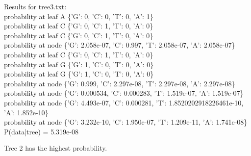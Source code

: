 \documentclass{acm_proc_article-sp}
\begin{document}
Results for tree3.txt: \\
probability at leaf A \{'G': 0, 'C': 0, 'T': 0, 'A': 1\}\\
probability at leaf C \{'G': 0, 'C': 1, 'T': 0, 'A': 0\}\\
probability at leaf C \{'G': 0, 'C': 1, 'T': 0, 'A': 0\}\\
probability at node \{'G': 2.058e-07, 'C': 0.997, 'T': 2.058e-07, 'A': 2.058e-07\}\\
probability at leaf C \{'G': 0, 'C': 1, 'T': 0, 'A': 0\}\\
probability at leaf G \{'G': 1, 'C': 0, 'T': 0, 'A': 0\}\\
probability at leaf G \{'G': 1, 'C': 0, 'T': 0, 'A': 0\}\\
probability at node \{'G': 0.999, 'C': 2.297e-08, 'T': 2.297e-08, 'A': 2.297e-08\}\\
probability at node \{'G': 0.000534, 'C': 0.000283, 'T': 1.519e-07, 'A': 1.519e-07\}\\
probability at node \{'G': 4.493e-07, 'C': 0.000281, 'T': 1.8520202918226461e-10, 'A': 1.852e-10\}\\
probability at node \{'G': 3.232e-10, 'C': 1.950e-07, 'T': 1.209e-11, 'A': 1.741e-08\}\\
P(data|tree) = 5.319e-08

Tree 2 has the highest probability.
%


%
%

\balancecolumns
\end{document}
